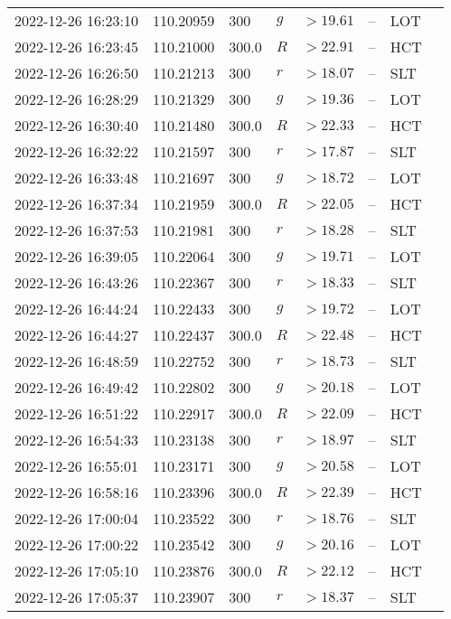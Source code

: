 \documentclass{nature_plusfigure}
\begin{document}
\begin{supplement}
\begin{center}
\begin{longtable}{llllllll}
2022-12-26 16:23:10 & 110.20959 & 300 & $g$ & $>19.61$ & -- & LOT &  \\ 
2022-12-26 16:23:45 & 110.21000 & 300.0 & $R$ & $>22.91$ & -- & HCT &  \\ 
2022-12-26 16:26:50 & 110.21213 & 300 & $r$ & $>18.07$ & -- & SLT &  \\ 
2022-12-26 16:28:29 & 110.21329 & 300 & $g$ & $>19.36$ & -- & LOT &  \\ 
2022-12-26 16:30:40 & 110.21480 & 300.0 & $R$ & $>22.33$ & -- & HCT &  \\ 
2022-12-26 16:32:22 & 110.21597 & 300 & $r$ & $>17.87$ & -- & SLT &  \\ 
2022-12-26 16:33:48 & 110.21697 & 300 & $g$ & $>18.72$ & -- & LOT &  \\ 
2022-12-26 16:37:34 & 110.21959 & 300.0 & $R$ & $>22.05$ & -- & HCT &  \\ 
2022-12-26 16:37:53 & 110.21981 & 300 & $r$ & $>18.28$ & -- & SLT &  \\ 
2022-12-26 16:39:05 & 110.22064 & 300 & $g$ & $>19.71$ & -- & LOT &  \\ 
2022-12-26 16:43:26 & 110.22367 & 300 & $r$ & $>18.33$ & -- & SLT &  \\ 
2022-12-26 16:44:24 & 110.22433 & 300 & $g$ & $>19.72$ & -- & LOT &  \\ 
2022-12-26 16:44:27 & 110.22437 & 300.0 & $R$ & $>22.48$ & -- & HCT &  \\ 
2022-12-26 16:48:59 & 110.22752 & 300 & $r$ & $>18.73$ & -- & SLT &  \\ 
2022-12-26 16:49:42 & 110.22802 & 300 & $g$ & $>20.18$ & -- & LOT &  \\ 
2022-12-26 16:51:22 & 110.22917 & 300.0 & $R$ & $>22.09$ & -- & HCT &  \\ 
2022-12-26 16:54:33 & 110.23138 & 300 & $r$ & $>18.97$ & -- & SLT &  \\ 
2022-12-26 16:55:01 & 110.23171 & 300 & $g$ & $>20.58$ & -- & LOT &  \\ 
2022-12-26 16:58:16 & 110.23396 & 300.0 & $R$ & $>22.39$ & -- & HCT &  \\ 
2022-12-26 17:00:04 & 110.23522 & 300 & $r$ & $>18.76$ & -- & SLT &  \\ 
2022-12-26 17:00:22 & 110.23542 & 300 & $g$ & $>20.16$ & -- & LOT &  \\ 
2022-12-26 17:05:10 & 110.23876 & 300.0 & $R$ & $>22.12$ & -- & HCT &  \\ 
2022-12-26 17:05:37 & 110.23907 & 300 & $r$ & $>18.37$ & -- & SLT &  \\ 

\end{longtable}
\end{center}
\end{supplement}
\end{document}
